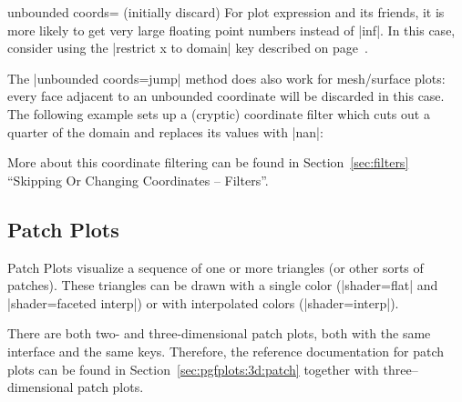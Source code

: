 {\begin{pgfplotskey}{unbounded coords= (initially discard)}
	For plot expression and its friends, it is more likely to get very large floating point numbers instead of |inf|. In this case, consider using the |restrict x to domain| key described on page~\pageref{key:restrict:x:to:domain}.

	The |unbounded coords=jump| method does also work for mesh/surface plots: every face adjacent to an unbounded coordinate will be discarded in this case. The following example sets up a (cryptic) coordinate filter which cuts out a quarter of the domain and replaces its values with |nan|:

\pgfplotsexpensiveexample
\begin{codeexample}[]
\end{codeexample}
\end{pgfplotskey}

More about this coordinate filtering can be found in Section~\ref{sec:filters} ``Skipping Or Changing Coordinates -- Filters''.

\subsection{Patch Plots}
Patch Plots visualize a sequence of one or more triangles (or other sorts of patches). These triangles can be drawn with a single color (|shader=flat| and |shader=faceted interp|) or with interpolated colors (|shader=interp|).

There are both two- and three-dimensional patch plots, both with the same interface and the same keys. Therefore, the reference documentation for patch plots can be found in Section~\ref{sec:pgfplots:3d:patch} together with three--dimensional patch plots.

\label{sec:pgfplots:2d:patch}
}
